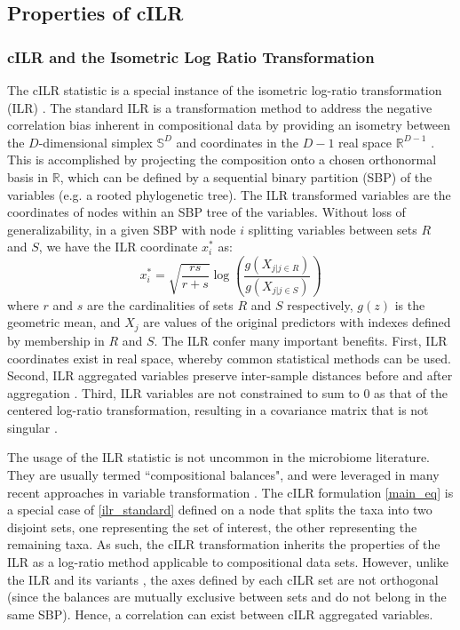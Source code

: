 \documentclass{article}
\begin{document}
\subsection*{Properties of cILR}
\subsubsection*{cILR and the Isometric Log Ratio Transformation}
The cILR statistic is a special instance of the isometric log-ratio transformation (ILR) \cite{egozcue2003}. The standard ILR is a transformation method to address the negative correlation bias inherent in compositional data by providing an isometry between the $D$-dimensional simplex $\mathbb{S}^D$ and coordinates in the $D-1$ real space $\mathbb{R}^{D-1}$ \cite{egozcue2003,washburne2017}. This is accomplished by projecting the composition onto a chosen orthonormal basis in $\mathbb{R}$, which can be defined by a sequential binary partition (SBP) of the variables (e.g. a rooted phylogenetic tree). The ILR transformed variables are the coordinates of nodes within an SBP tree of the variables. Without loss of generalizability, in a given SBP with node $i$ splitting variables between sets $R$ and $S$, we have the ILR coordinate $x^{*}_{i}$ as: 
\begin{equation}\label{ilr_standard}
    x^{*}_i = \sqrt{\frac{rs}{r+s}} \log\left(\frac{g(X_{j|j \in R})}{g(X_{j|j \in S})}\right)
\end{equation}
where $r$ and $s$ are the cardinalities of sets $R$ and $S$ respectively, $g(z)$ is the geometric mean, and $X_{j}$ are values of the original predictors with indexes defined by membership in $R$ and $S$. The ILR confer many important benefits. First, ILR coordinates exist in real space, whereby common statistical methods can be used. Second, ILR aggregated variables preserve inter-sample distances before and after aggregation \cite{egozcue2005}. Third, ILR variables are not constrained to sum to 0 as that of the centered log-ratio transformation, resulting in a covariance matrix that is not singular \cite{egozcue2003}. 

The usage of the ILR statistic is not uncommon in the microbiome literature. They are usually termed ``compositional balances", and were leveraged in many recent approaches in variable transformation \cite{washburne2017,silverman2017,morton2017}. The cILR formulation \eqref{main_eq} is a special case of \eqref{ilr_standard} defined on a node that splits the taxa into two disjoint sets, one representing the set of interest, the other representing the remaining taxa. As such, the cILR transformation inherits the properties of the ILR as a log-ratio method applicable to compositional data sets. However, unlike the ILR and its variants \cite{silverman2017, morton2017, washburne2017}, the axes defined by each cILR set are not orthogonal (since the balances are mutually exclusive between sets and do not belong in the same SBP). Hence, a correlation can exist between cILR aggregated variables.  
\end{document}
